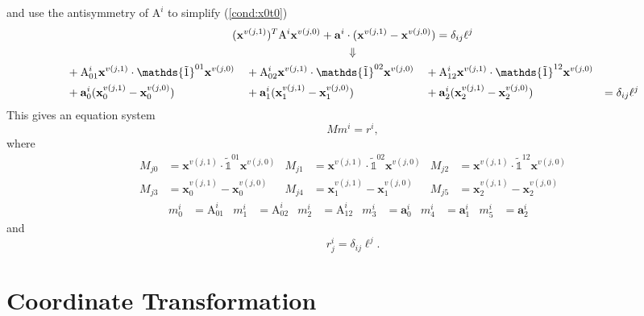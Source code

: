 \documentclass{scrartcl}
\begin{document}
and use the antisymmetry of $\mathrm A^i$ to simplify (\ref{cond:x0t0})
\begin{gather}
  (\mathbf x^{v(j,1)})^T\mathrm A^i\mathbf x^{v(j,0)}
  +\mathbf a^i\cdot(\mathbf x^{v(j,1)}-\mathbf x^{v(j,0)})
  =\delta_{ij}\ell^j \\
  \Downarrow \notag\\
  \begin{aligned}
  &+\mathrm A^i_{01}\mathbf x^{v(j,1)}\cdot\mathds{\tilde1}^{01}\mathbf x^{v(j,0)}&
  &+\mathrm A^i_{02}\mathbf x^{v(j,1)}\cdot\mathds{\tilde1}^{02}\mathbf x^{v(j,0)}&
  &+\mathrm A^i_{12}\mathbf x^{v(j,1)}\cdot\mathds{\tilde1}^{12}\mathbf x^{v(j,0)}\\
  &+\mathbf a^i_0(\mathbf x^{v(j,1)}_0-\mathbf x^{v(j,0)}_0)&
  &+\mathbf a^i_1(\mathbf x^{v(j,1)}_1-\mathbf x^{v(j,0)}_1)&
  &+\mathbf a^i_2(\mathbf x^{v(j,1)}_2-\mathbf x^{v(j,0)}_2)&
  =\delta_{ij}\ell^j
  \end{aligned}
\end{gather}
This gives an equation system
\begin{equation}
  Mm^i=r^i,
\end{equation}
where
\begin{equation}
  \begin{aligned}
  M_{j0}&=\mathbf x^{v(j,1)}\cdot\mathds{\tilde1}^{01}\mathbf x^{v(j,0)}&
  M_{j1}&=\mathbf x^{v(j,1)}\cdot\mathds{\tilde1}^{02}\mathbf x^{v(j,0)}&
  M_{j2}&=\mathbf x^{v(j,1)}\cdot\mathds{\tilde1}^{12}\mathbf x^{v(j,0)}\\
  M_{j3}&=\mathbf x^{v(j,1)}_0-\mathbf x^{v(j,0)}_0&
  M_{j4}&=\mathbf x^{v(j,1)}_1-\mathbf x^{v(j,0)}_1&
  M_{j5}&=\mathbf x^{v(j,1)}_2-\mathbf x^{v(j,0)}_2
  \end{aligned}
\end{equation}
\begin{align}
  m^i_0&=\mathrm A^i_{01}&
  m^i_1&=\mathrm A^i_{02}&
  m^i_2&=\mathrm A^i_{12}&
  m^i_3&=\mathbf a^i_0&
  m^i_4&=\mathbf a^i_1&
  m^i_5&=\mathbf a^i_2&
\end{align}
and
\begin{equation}
  r^i_j=\delta_{ij}\ell^j.
\end{equation}


\section{Coordinate Transformation}
\end{document}
